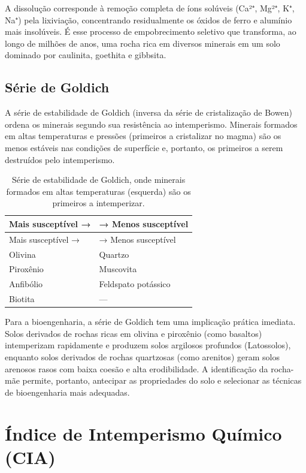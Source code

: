 \documentclass[
  portuguese,
  11pt,
  a4paper,
  open=any]{scrbook}
\begin{document}
A dissolução corresponde à remoção completa de íons solúveis (Ca²⁺,
Mg²⁺, K⁺, Na⁺) pela lixiviação, concentrando residualmente os óxidos de
ferro e alumínio mais insolúveis. É esse processo de empobrecimento
seletivo que transforma, ao longo de milhões de anos, uma rocha rica em
diversos minerais em um solo dominado por caulinita, goethita e
gibbsita.

\subsection{Série de Goldich}\label{suxe9rie-de-goldich}

A série de estabilidade de Goldich (inversa da série de cristalização de
Bowen) ordena os minerais segundo sua resistência ao intemperismo.
Minerais formados em altas temperaturas e pressões (primeiros a
cristalizar no magma) são os menos estáveis nas condições de superfície
e, portanto, os primeiros a serem destruídos pelo intemperismo.

\begin{longtable}[]{@{}ll@{}}
\caption{Série de estabilidade de Goldich, onde minerais formados em
altas temperaturas (esquerda) são os primeiros a
intemperizar.}\label{tbl-goldich}\tabularnewline
\toprule\noalign{}
Mais susceptível → & → Menos susceptível \\
\midrule\noalign{}
\endfirsthead
\toprule\noalign{}
Mais susceptível → & → Menos susceptível \\
\midrule\noalign{}
\endhead
\bottomrule\noalign{}
\endlastfoot
Olivina & Quartzo \\
Piroxênio & Muscovita \\
Anfibólio & Feldspato potássico \\
Biotita & --- \\
\end{longtable}

Para a bioengenharia, a série de Goldich tem uma implicação prática
imediata. Solos derivados de rochas ricas em olivina e piroxênio (como
basaltos) intemperizam rapidamente e produzem solos argilosos profundos
(Latossolos), enquanto solos derivados de rochas quartzosas (como
arenitos) geram solos arenosos rasos com baixa coesão e alta
erodibilidade. A identificação da rocha-mãe permite, portanto, antecipar
as propriedades do solo e selecionar as técnicas de bioengenharia mais
adequadas.

\section{Índice de Intemperismo Químico
(CIA)}\label{uxedndice-de-intemperismo-quuxedmico-cia}
\end{document}
